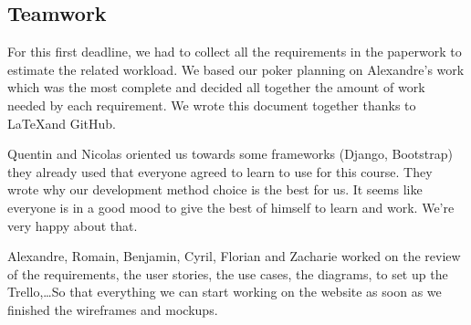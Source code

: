 \subsection{Teamwork}


For this first deadline, we had to collect all the requirements in the
paperwork to estimate the related workload. We based our poker planning
on Alexandre's work which was the most complete and decided all together the
amount of work needed by each requirement. We wrote this document
together thanks to \LaTeX  and GitHub.\newline

Quentin and Nicolas oriented us towards some frameworks (Django,
Bootstrap) they already used that everyone agreed to learn to use for
this course. They wrote why our development method choice is the best
for us. It seems like everyone is in a good mood to give the best of
himself to learn and work. We're very happy about that. \newline

Alexandre, Romain, Benjamin, Cyril, Florian and Zacharie worked on the
review of the requirements, the user stories, the use cases, the
diagrams, to set up the Trello,\ldots So that everything we can start
working on the website as soon as we finished the wireframes and
mockups. \newline
